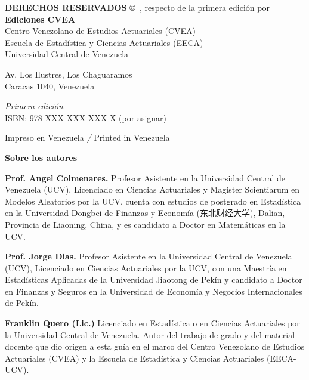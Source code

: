 \vspace{1em}
\textbf{DERECHOS RESERVADOS} \copyright\ \the\year, respecto de la primera edición por\\
\textbf{Ediciones CVEA}\\
Centro Venezolano de Estudios Actuariales (CVEA)\\
Escuela de Estadística y Ciencias Actuariales (EECA)\\
Universidad Central de Venezuela

\vspace{0.8em}
Av. Los Ilustres, Los Chaguaramos\\
Caracas 1040, Venezuela

\vspace{0.5em}
\textit{Primera edición}\\
ISBN: 978-XXX-XXX-XXX-X (por asignar)

\vspace{1em}
\small
Impreso en Venezuela \textit{/} Printed in Venezuela

\vfill
\newpage

\thispagestyle{empty}
\vspace*{1.2cm}
\begin{center}
{\LARGE\bfseries Sobre los autores}
\end{center}
\vspace{1.2cm}

{\large\textbf{Prof. Angel Colmenares.}} Profesor Asistente en la Universidad Central de Venezuela (UCV), Licenciado en Ciencias Actuariales y Magister Scientiarum en Modelos Aleatorios por la UCV, cuenta con estudios de postgrado en Estadística en la Universidad Dongbei de Finanzas y Economía (东北财经大学), Dalian, Provincia de Liaoning, China, y es candidato a Doctor en Matemáticas en la UCV.

\vspace{1.2em}
{\large\textbf{Prof. Jorge Dias.}} Profesor Asistente en la Universidad Central de Venezuela (UCV), Licenciado en Ciencias Actuariales por la UCV, con una Maestría en Estadísticas Aplicadas de la Universidad Jiaotong de Pekín y candidato a Doctor en Finanzas y Seguros en la Universidad de Economía y Negocios Internacionales de Pekín.

\vspace{1.2em}
{\large\textbf{Franklin Quero (Lic.)}} Licenciado en Estadística o en Ciencias Actuariales por la Universidad Central de Venezuela. Autor del trabajo de grado y del material docente que dio origen a esta guía en el marco del Centro Venezolano de Estudios Actuariales (CVEA) y la Escuela de Estadística y Ciencias Actuariales (EECA-UCV).

